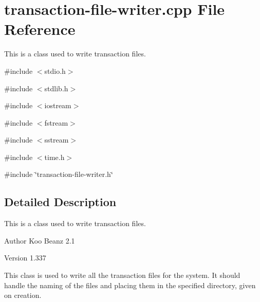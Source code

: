 \hypertarget{transaction-file-writer_8cpp}{
\section{transaction-\/file-\/writer.cpp File Reference}
\label{transaction-file-writer_8cpp}
}


This is a class used to write transaction files.  


{\ttfamily \#include $<$stdio.h$>$}\par
{\ttfamily \#include $<$stdlib.h$>$}\par
{\ttfamily \#include $<$iostream$>$}\par
{\ttfamily \#include $<$fstream$>$}\par
{\ttfamily \#include $<$sstream$>$}\par
{\ttfamily \#include $<$time.h$>$}\par
{\ttfamily \#include \char`\"{}transaction-\/file-\/writer.h\char`\"{}}\par


\subsection{Detailed Description}
This is a class used to write transaction files. \begin{DoxyAuthor}{Author}
Koo Beanz 2.1 
\end{DoxyAuthor}
\begin{DoxyVersion}{Version}
1.337
\end{DoxyVersion}
This class is used to write all the transaction files for the system. It should handle the naming of the files and placing them in the specified directory, given on creation. 